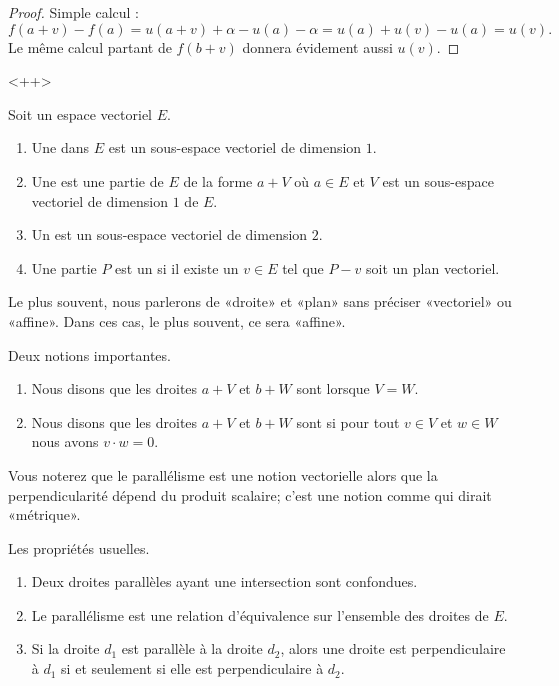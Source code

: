 \begin{proof}
    Simple calcul :
    \begin{equation}
        f(a+v)-f(a)=u(a+v)+\alpha-u(a)-\alpha=u(a)+u(v)-u(a)=u(v).
    \end{equation}
    Le même calcul partant de \( f(b+v)\) donnera évidement aussi \( u(v)\).
\end{proof}
<++>

\begin{definition}      \label{DEFooTQIFooKcloeY}
	Soit un espace vectoriel \( E\).
	\begin{enumerate}
		\item
		      Une  dans \( E\) est un sous-espace vectoriel de dimension \( 1\).
		\item
		      Une  est une partie de \( E\) de la forme \( a+V\) où \( a\in E\) et \( V\) est un sous-espace vectoriel de dimension \( 1\) de \( E\).
		\item
		      Un  est un sous-espace vectoriel de dimension \( 2\).
		\item
		      Une partie \( P\) est un  si il existe un \( v\in E\) tel que \( P-v\) soit un plan vectoriel.
	\end{enumerate}
	Le plus souvent, nous parlerons de «droite» et «plan» sans préciser «vectoriel» ou «affine». Dans ces cas, le plus souvent, ce sera «affine».
\end{definition}

\begin{definition}
	Deux notions importantes.
	\begin{enumerate}
		\item
		      Nous disons que les droites \( a+V\) et \( b+W\) sont  lorsque \( V=W\).
		\item
		      Nous disons que les droites \( a+V\) et \( b+W\) sont  si pour tout \( v\in V\) et \( w\in W\) nous avons \( v\cdot w=0\).
	\end{enumerate}
	Vous noterez que le parallélisme est une notion vectorielle alors que la perpendicularité dépend du produit scalaire; c'est une notion comme qui dirait «métrique».
\end{definition}

\begin{proposition}     \label{PROPooADJNooMyXUxG}
	Les propriétés usuelles.
	\begin{enumerate}
		\item
		      Deux droites parallèles ayant une intersection sont confondues.
		\item
		      Le parallélisme est une relation d'équivalence sur l'ensemble des droites de \( E\).
		\item
		      Si la droite \( d_1\) est parallèle à la droite \( d_2\), alors une droite est perpendiculaire à \( d_1\) si et seulement si elle est perpendiculaire à \( d_2\).
	\end{enumerate}
\end{proposition}

